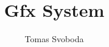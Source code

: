 \documentclass[12pt, a4paper]{article}
\begin{document}
\title{Gfx System}
\author{Tomas Svoboda}
\maketitle

\tableofcontents

\newpage


\end{document}
